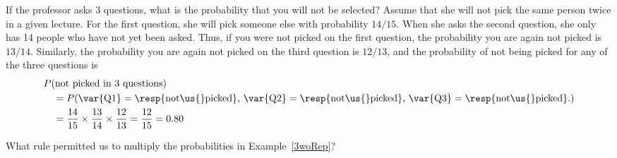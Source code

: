 \begin{examplewrap}
\begin{nexample}{If the professor asks 3 questions, what is the probability that you will not be selected? Assume that she will not pick the same person twice in a given lecture.}\label{3woRep}
For the first question, she will pick someone else with probability $14/15$. When she asks the second question, she only has 14 people who have not yet been asked. Thus, if you were not picked on the first question, the probability you are again not picked is $13/14$. Similarly, the probability you are again not picked on the third question is $12/13$, and the probability of not being picked for any of the three questions is
\begin{align*}
&P(\text{not picked in 3 questions}) \\
&\quad = P(\text{\var{Q1}} = \text{\resp{not\us{}picked}, }\text{\var{Q2}} = \text{\resp{not\us{}picked}, }\text{\var{Q3}} = \text{\resp{not\us{}picked}.}) \\
&\quad = \frac{14}{15}\times\frac{13}{14}\times\frac{12}{13} = \frac{12}{15} = 0.80
\end{align*}
\end{nexample}
\end{examplewrap}

\begin{exercisewrap}
\begin{nexercise}
What rule permitted us to multiply the probabilities in Example~\ref{3woRep}?\footnotemark
\end{nexercise}
\end{exercisewrap}

\D{\newpage}

